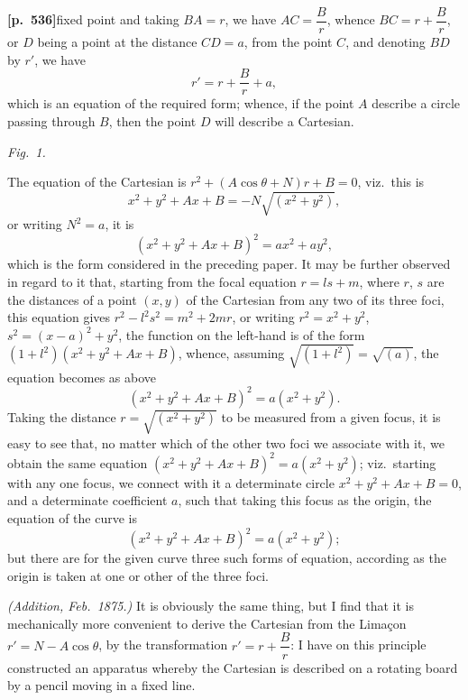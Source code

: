 \documentclass[11pt,a4paper]{article}
\begin{document}
\bigskip

\noindent\textbf{[p.~536]}\quad fixed point and taking $BA = r$, we have $AC = \dfrac{B}{r}$, whence $BC = r + \dfrac{B}{r}$, or $D$ being a point at the distance $CD = a$, from the point $C$, and denoting $BD$ by $r'$, we have
\[
r' = r + \frac{B}{r} + a,
\]
which is an equation of the required form; whence, if the point $A$ describe a circle passing through $B$, then the point $D$ will describe a Cartesian.

\begin{center}
\textit{Fig.~1.}
\end{center}

\bigskip

The equation of the Cartesian is $r^{2} + (A\cos\theta + N) r + B = 0$, viz.\ this is
\[
x^{2} + y^{2} + Ax + B = -N\sqrt{(x^{2} + y^{2})},
\]
or writing $N^{2} = a$, it is
\[
(x^{2} + y^{2} + Ax + B)^{2} = a x^{2} + a y^{2},
\]
which is the form considered in the preceding paper. It may be further observed in regard to it that, starting from the focal equation $r = l s + m$, where $r$, $s$ are the distances of a point $(x, y)$ of the Cartesian from any two of its three foci, this equation gives $r^{2} - l^{2} s^{2} = m^{2} + 2 m r$, or writing $r^{2} = x^{2} + y^{2}$, $s^{2} = (x - a)^{2} + y^{2}$, the function on the left-hand is of the form $(1 + l^{2})(x^{2} + y^{2} + Ax + B)$, whence, assuming $\sqrt{(1 + l^{2})} = \sqrt{(a)}$, the equation becomes as above
\[
(x^{2} + y^{2} + Ax + B)^{2} = a(x^{2} + y^{2}).
\]
Taking the distance $r = \sqrt{(x^{2} + y^{2})}$ to be measured from a given focus, it is easy to see that, no matter which of the other two foci we associate with it, we obtain the same equation $(x^{2} + y^{2} + Ax + B)^{2} = a(x^{2} + y^{2})$; viz.\ starting with any one focus, we connect with it a determinate circle $x^{2} + y^{2} + Ax + B = 0$, and a determinate coefficient $a$, such that taking this focus as the origin, the equation of the curve is
\[
(x^{2} + y^{2} + Ax + B)^{2} = a(x^{2} + y^{2});
\]
but there are for the given curve three such forms of equation, according as the origin is taken at one or other of the three foci.

\medskip

\textit{(Addition, Feb.~1875.)} It is obviously the same thing, but I find that it is mechanically more convenient to derive the Cartesian from the Lima\c{c}on $r' = N - A\cos\theta$, by the transformation $r' = r + \dfrac{B}{r}$: I have on this principle constructed an apparatus whereby the Cartesian is described on a rotating board by a pencil moving in a fixed line.
\end{document}
